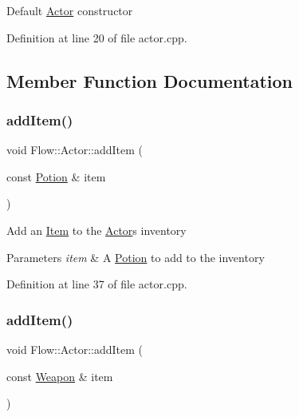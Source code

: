 Default \hyperlink{class_flow_1_1_actor}{Actor} constructor 

Definition at line 20 of file actor.\+cpp.



\subsection{Member Function Documentation}
\hypertarget{class_flow_1_1_actor_a6ea333bb237a2c0cf932048003b4a4cd}{}\label{class_flow_1_1_actor_a6ea333bb237a2c0cf932048003b4a4cd} 
\subsubsection{\texorpdfstring{add\+Item()}{addItem()}\hspace{0.1cm}{\footnotesize\ttfamily [1/4]}}
{\footnotesize\ttfamily void Flow\+::\+Actor\+::add\+Item (\begin{DoxyParamCaption}\item[{const \hyperlink{class_flow_1_1_potion}{Potion} \&}]{item }\end{DoxyParamCaption})}

Add an \hyperlink{class_flow_1_1_item}{Item} to the \hyperlink{class_flow_1_1_actor}{Actor}\textquotesingle{}s inventory 
\begin{DoxyParams}{Parameters}
{\em item} & A \hyperlink{class_flow_1_1_potion}{Potion} to add to the inventory \\
\hline
\end{DoxyParams}


Definition at line 37 of file actor.\+cpp.

\hypertarget{class_flow_1_1_actor_a330ec5658330568c65799ccd34e77889}{}\label{class_flow_1_1_actor_a330ec5658330568c65799ccd34e77889} 
\subsubsection{\texorpdfstring{add\+Item()}{addItem()}\hspace{0.1cm}{\footnotesize\ttfamily [2/4]}}
{\footnotesize\ttfamily void Flow\+::\+Actor\+::add\+Item (\begin{DoxyParamCaption}\item[{const \hyperlink{class_flow_1_1_weapon}{Weapon} \&}]{item }\end{DoxyParamCaption})}

